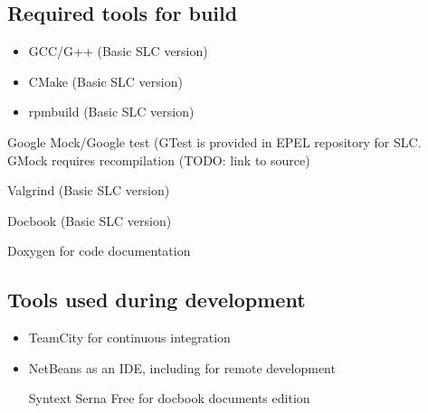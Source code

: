 \subsection{ Required tools for build}
\begin{itemize}

\item{}GCC/G++ (Basic SLC version)


\item{}CMake (Basic SLC version)


\item{}rpmbuild (Basic SLC version)

\end{itemize}

Google Mock/Google test (GTest is provided in EPEL repository for SLC. GMock requires recompilation (TODO: link to source)

Valgrind (Basic SLC version)

Docbook (Basic SLC version)

Doxygen for code documentation

\subsection{Tools used during development}
\begin{itemize}

\item{}TeamCity for continuous integration


\item{}NetBeans as an IDE, including for remote development

Syntext Serna Free for docbook documents edition

\end{itemize}


